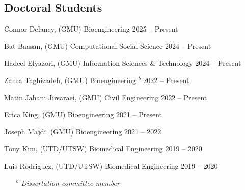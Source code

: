 \documentclass[letterpaper, 10pt]{article}
\begin{document}
\subsection{\textbf{Doctoral Students}} %
\begin{compacthang}
     \item Connor Delaney, (GMU) Bioengineering \hfill 2025 -- Present     
     \item Bat Baasan, (GMU) Computational Social Science \hfill 2024 -- Present
     \item Hadeel Elyazori, (GMU) Information Sciences \& Technology \hfill 2024 -- Present
     \item Zahra Taghizadeh, (GMU) Bioengineering $^{b}$ \hfill 2022 -- Present
	\item Matin Jahani Jirsaraei, (GMU) Civil Engineering \hfill 2022 -- Present
	\item Erica King, (GMU) Bioengineering \hfill 2021 -- Present
	\item Joseph Majdi, (GMU) Bioengineering \hfill 2021 -- 2022
	\item Tony Kim, (UTD/UTSW) Biomedical Engineering \hfill 2019 -- 2020
	\item Luis Rodriguez, (UTD/UTSW) Biomedical Engineering \hfill 2019 -- 2020
     \begin{itemize}
	     \item[$^{b}$] \textit{\small Dissertation committee member}
     \end{itemize}	
\end{compacthang}
\end{document}
